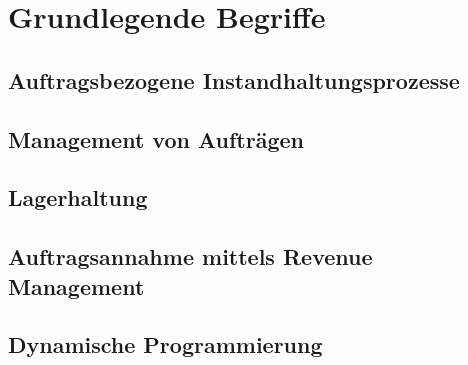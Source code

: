 \chapter{Grundlegende Begriffe}
\setcounter{footnote}{4}  %

\section{Auftragsbezogene Instandhaltungsprozesse}

\section{Management von Aufträgen}

\section{Lagerhaltung}

\section{Auftragsannahme mittels Revenue Management}

\section{Dynamische Programmierung}